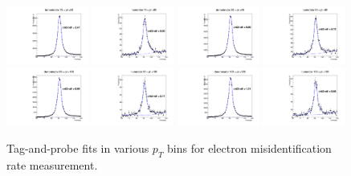 \documentclass[thesis.tex]{subfiles}
\renewcommand\_{\textunderscore\allowbreak}
\begin{document}
\begin{figure}
   \includegraphics[width=0.24\textwidth]{Figures/Bw_ker_pt_den_75_80.pdf}  \includegraphics[width=0.24\textwidth]{Figures/Bw_ker_pt_num_75_80.pdf}   \includegraphics[width=0.24\textwidth]{Figures/Bw_ker_pt_den_80_90.pdf} \includegraphics[width=0.24\textwidth]{Figures/Bw_ker_pt_num_80_90.pdf} \\
    \includegraphics[width=0.24\textwidth]{Figures/Bw_ker_pt_den_90_100.pdf}  \includegraphics[width=0.24\textwidth]{Figures/Bw_ker_pt_num_90_100.pdf}   \includegraphics[width=0.24\textwidth]{Figures/Bw_ker_pt_den_100_120.pdf} \includegraphics[width=0.24\textwidth]{Figures/Bw_ker_pt_num_100_120.pdf} \\
  \caption{Tag-and-probe fits in various $p_T$ bins for electron misidentification rate measurement. }
 \label{fig:fitAllele}
\end{figure}
\end{document}
